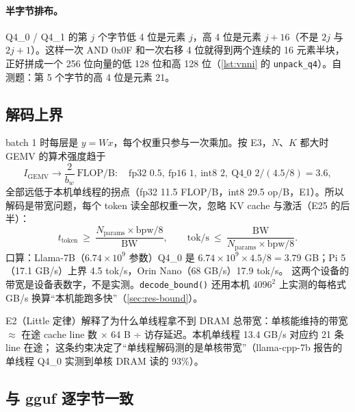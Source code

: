 \documentclass[11pt,a4paper]{ctexart}
\begin{document}
\paragraph{半字节排布。}Q4\_0 / Q4\_1 的第 $j$ 个字节低 4 位是元素 $j$，高 4 位是元素 $j+16$（不是 $2j$ 与 $2j+1$）。这样一次 AND 0x0F 和一次右移 4 位就得到两个连续的 16 元素半块，
正好拼成一个 256 位向量的低 128 位和高 128 位（\cref{lst:vnni} 的 \texttt{unpack\_q4}）。自测题：第 5 个字节的高 4 位是元素 21。

\subsection{解码上界}\label{sec:bound}

batch 1 时每层是 $y = Wx$，每个权重只参与一次乘加。按 E3，$N$、$K$ 都大时 GEMV 的算术强度趋于
\begin{equation}
I_{\text{GEMV}} \to \frac{2}{b_w}\ \text{FLOP/B}: \quad \text{fp32 } 0.5,\ \text{fp16 } 1,\ \text{int8 } 2,\ \text{Q4\_0 } 2/(4.5/8) = 3.6 ,
\label{eq:intensity}
\end{equation}
全部远低于本机单线程的拐点（fp32 11.5 FLOP/B，int8 29.5 op/B，E1）。所以解码是带宽问题，每个 token 读全部权重一次，忽略 KV cache 与激活（E25 的后半）：
\begin{equation}
t_{\text{token}} \ \ge\ \frac{N_{\text{params}} \times \text{bpw} / 8}{\text{BW}}, \qquad \text{tok/s} \ \le\ \frac{\text{BW}}{N_{\text{params}} \times \text{bpw}/8} .
\label{eq:bound}
\end{equation}
口算：Llama-7B（$6.74\times10^9$ 参数）Q4\_0 是 $6.74\times10^9 \times 4.5/8 = 3.79$ GB；Pi 5（17.1 GB/s）上界 4.5 tok/s，Orin Nano（68 GB/s）17.9 tok/s。
这两个设备的带宽是设备表数字，不是实测。\texttt{decode\_bound()} 还用本机 $4096^2$ 上实测的每格式 GB/s 换算“本机能跑多快”（\cref{sec:res-bound}）。

E2（Little 定律）解释了为什么单线程拿不到 DRAM 总带宽：单核能维持的带宽 $\approx$ 在途 cache line 数 × 64 B ÷ 访存延迟。本机单线程 13.4 GB/s 对应约 21 条 line 在途；
这条约束决定了“单线程解码测的是单核带宽”（llama-cpp-7b 报告的单线程 Q4\_0 实测到单核 DRAM 读的 93\%）。

\subsection{与 gguf 逐字节一致}\label{sec:byteexact}
\end{document}
